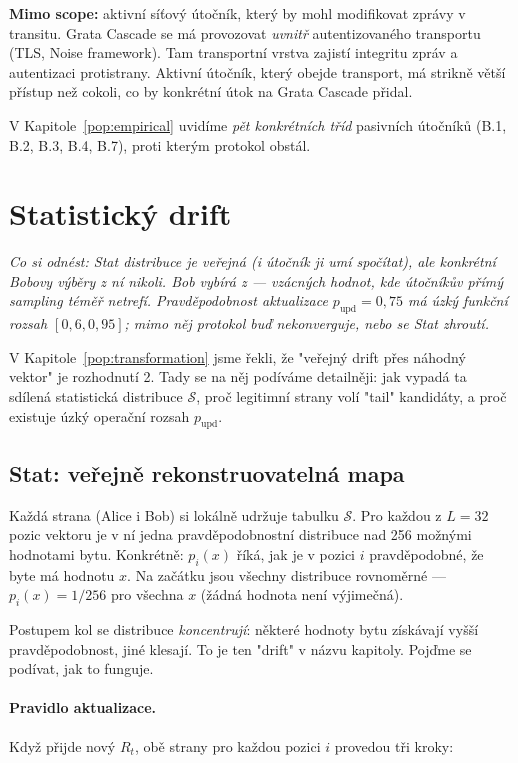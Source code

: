 \documentclass[11pt,a4paper]{article}
\begin{document}
\textbf{Mimo scope:} aktivní síťový útočník, který by mohl modifikovat zprávy v transitu. Grata Cascade se má provozovat \emph{uvnitř} autentizovaného transportu (TLS, Noise framework). Tam transportní vrstva zajistí integritu zpráv a autentizaci protistrany. Aktivní útočník, který obejde transport, má strikně větší přístup než cokoli, co by konkrétní útok na Grata Cascade přidal.

V Kapitole~\ref{pop:empirical} uvidíme \emph{pět konkrétních tříd} pasivních útočníků (B.1, B.2, B.3, B.4, B.7), proti kterým protokol obstál.

\section{Statistický drift}\label{pop:drift}

\noindent\textit{Co si odnést: Stat distribuce je veřejná (i útočník ji umí spočítat), ale konkrétní Bobovy výběry z ní nikoli. Bob vybírá z \mbox{} --- vzácných hodnot, kde útočníkův přímý sampling téměř netrefí. Pravděpodobnost aktualizace $p_\text{upd} = 0{,}75$ má úzký funkční rozsah $[0{,}6, 0{,}95]$; mimo něj protokol buď nekonverguje, nebo se Stat zhroutí.}

\medskip

V Kapitole~\ref{pop:transformation} jsme řekli, že "veřejný drift přes náhodný vektor" je rozhodnutí 2. Tady se na něj podíváme detailněji: jak vypadá ta sdílená statistická distribuce $\mathcal{S}$, proč legitimní strany volí "tail" kandidáty, a proč existuje úzký operační rozsah $p_\text{upd}$.

\subsection{Stat: veřejně rekonstruovatelná mapa}\label{pop:stat-map}

Každá strana (Alice i Bob) si lokálně udržuje tabulku $\mathcal{S}$. Pro každou z $L = 32$ pozic vektoru je v ní jedna pravděpodobnostní distribuce nad 256 možnými hodnotami bytu. Konkrétně: $p_i(x)$ říká, jak je v pozici $i$ pravděpodobné, že byte má hodnotu $x$. Na začátku jsou všechny distribuce rovnoměrné --- $p_i(x) = 1/256$ pro všechna $x$ (žádná hodnota není výjimečná).

Postupem kol se distribuce \emph{koncentrují}: některé hodnoty bytu získávají vyšší pravděpodobnost, jiné klesají. To je ten "drift" v názvu kapitoly. Pojďme se podívat, jak to funguje.

\paragraph{Pravidlo aktualizace.} Když přijde nový $R_t$, obě strany pro každou pozici $i$ provedou tři kroky:
\end{document}
